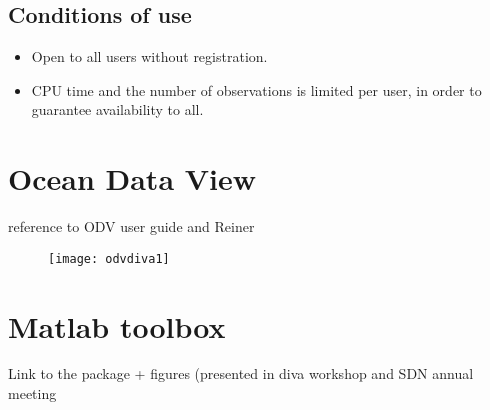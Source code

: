 \subsection{Conditions of use}


\begin{itemize}
\item Open to all users without registration.
\item CPU time and the number of observations is limited per user, in order to guarantee availability to all.
\end{itemize}


\section{Ocean Data View}

reference to ODV user guide and Reiner


\begin{figure}[H]
\centering 
\texttt{[image: odvdiva1]}
\caption{\label{fig:divaonweb6}}
\end{figure}

\section{Matlab toolbox}

Link to the package +
figures (presented in diva workshop and SDN annual meeting
